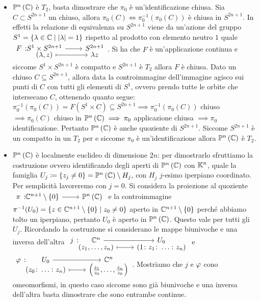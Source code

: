 \begin{itemize}
	\item $\proj[n]{\complexset}$ è $T_2$, basta dimostrare che $\pi_0$ è un'identificazione chiusa. Sia $C\subset S^{2n+1}$ un chiuso, allora $\pi_0(C)\iff \pi_0^{-1}(\pi_0(C))$ è chiusa in $S^{2n+1}$. In effetti la relazione di equivalenza su $S^{2n+1}$ viene da un'azione del gruppo $S^1=\{\lambda\in\mathbb{C} \mid |\lambda |=1\}$ rispetto al prodotto con elemento neutro $1$ quale $\funztot F {S^1\times S^{2n+1}} {S^{2n+1}} {(\lambda, z)} {\lambda z}$. Si ha che $F$ è un'applicazione continua e siccome $S^1\times S^{2n+1}$ è compatto e $S^{2n+1}$ è $T_2$ allora $F$ è chiusa. Dato un chiuso $C\subseteq S^{2n+1}$, allora data la controimmagine dell'immagine agisco sui punti di $C$ con tutti gli elementi di $S^1$, ovvero prendo tutte le orbite che intersecano $C$, ottenendo quanto segue:	
	$\pi_0^{-1}(\pi_0(C))=F(S^1\times C)\subseteq S^{2n+1} \implies \pi_0^{-1}(\pi_0(C))$ chiuso $\implies \pi_0(C)$ chiuso in $\proj[n]{\complexset} \implies \pi_0$ applicazione chiusa $\implies \pi_0$ identificazione. Pertanto $\proj[n]{\complexset}$ è anche quoziente di $S^{2n+1}$. Siccome $S^{2n+1}$ è un compatto in un $T_2$ per 
	e siccome $\pi_0$ è un'identificazione allora $\proj[n]{\complexset}$ è $T_2$.
	\item $\proj[n]{\complexset}$ è localmente euclideo di dimensione $2n$: per dimostrarlo sfruttiamo la costruzione
	ovvero identificando degli aperti di $\proj[n]{\complexset}$ con $\mathbb{K}^n$, quale la famiglia $U_j\coloneqq\{z_j\neq 0\}=\proj[n]{\complexset}\setminus H_j$, con $H_j$ $j$-esimo iperpiano coordinato. Per semplicità lavoreremo con $j=0$.\newline 
	Si considera la proiezione al quoziente $\funz \pi {\complexset^{n+1}\setminus\{0\}} {\proj[n]{\complexset}}$ e la controimmagine $\pi^{-1}(U_0)=\{z\in\mathbb{C}^{n+1}\setminus\{0\}\mid z_0\neq 0\}$ aperto in $\mathbb{C}^{n+1}\setminus\{0\}$ perché abbiamo tolto un iperpiano, pertanto $U_0$ è aperto in $\proj[n]{\complexset}$. Questo vale per tutti gli $U_j$. Ricordando la costruzione 
	si considerano le mappe biunivoche e una inversa dell'altra $\funztot j {\complexset^n} {U_0} {(z_1,\dots,z_n)} {(1\colon z_1\colon \dots\colon z_n)}$ e $\funztot \oldphi {U_0} {\complexset^n} {(z_0\colon\dots\colon z_n)} {\left( \frac{z_1}{z_0},\dots,\frac{z_n}{z_0} \right)}$. Mostriamo che $j$ e $\oldphi$ cono omeomorfismi, in questo caso siccome sono già biunivoche e una inversa dell'altra basta dimostrare che sono entrambe continue.

\end{itemize}
